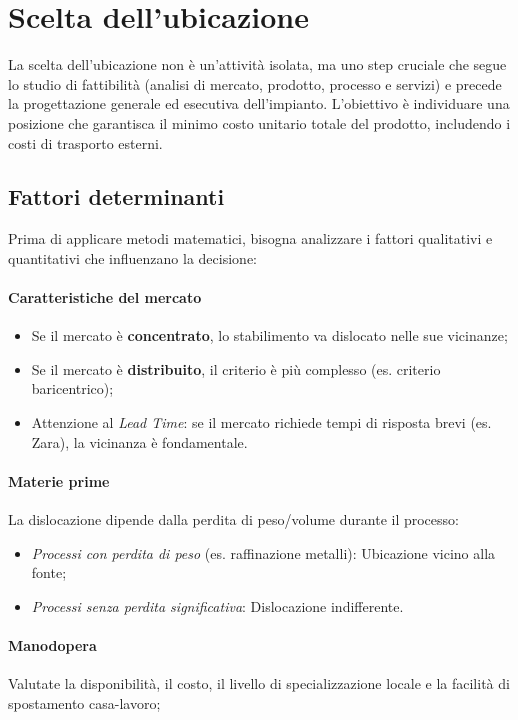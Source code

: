 %
\section{Scelta dell'ubicazione}
La scelta dell'ubicazione non è un'attività isolata, ma uno step cruciale che segue lo studio di fattibilità (analisi di mercato, prodotto, processo e servizi) e precede la progettazione generale ed esecutiva dell'impianto. L'obiettivo è individuare una posizione che garantisca il minimo costo unitario totale del prodotto, includendo i costi di trasporto esterni.
%
\subsection{Fattori determinanti}
Prima di applicare metodi matematici, bisogna analizzare i fattori qualitativi e quantitativi che influenzano la decisione:
%
\paragraph{Caratteristiche del mercato}
\begin{itemize}
    \item Se il mercato è \textbf{concentrato}, lo stabilimento va dislocato nelle sue vicinanze;
    \item Se il mercato è \textbf{distribuito}, il criterio è più complesso (es. criterio baricentrico);
    \item Attenzione al \emph{Lead Time}: se il mercato richiede tempi di risposta brevi (es. Zara), la vicinanza è fondamentale.
\end{itemize}
%
\paragraph{Materie prime} La dislocazione dipende dalla perdita di peso/volume durante il processo:
\begin{itemize}
    \item \emph{Processi con perdita di peso} (es. raffinazione metalli): Ubicazione vicino alla fonte;
    \item \emph{Processi senza perdita significativa}: Dislocazione indifferente.
\end{itemize}
%
\paragraph{Manodopera} Valutate la disponibilità, il costo, il livello di specializzazione locale e la facilità di spostamento casa-lavoro;
%
